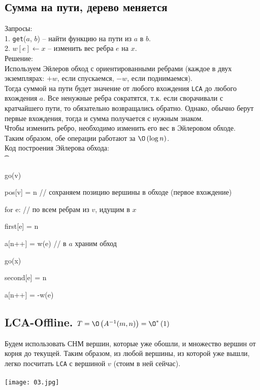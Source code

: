   \subsection{Сумма на пути, дерево меняется}
	Запросы: \\
	1. \texttt{get}($a$, $b$) -- найти функцию на пути из $a$ в $b$.\\
	2. $w[e] \leftarrow x$ -- изменить вес ребра $e$ на $x$. \\
	Решение: \\
	Используем Эйлеров обход с ориентированными ребрами (каждое в двух экземплярах: $+w$, если спускаемся, $-w$, если поднимаемся). \\
	Тогда суммой на пути будет значение от любого вхождения \texttt{LCA} до любого вхождения $a$. Все ненужные ребра сократятся, т.к. если сворачивали с кратчайшего пути, то обязательно возвращались обратно. Однако, обычно берут первые вхождения, тогда и сумма получается с нужным знаком.\\
	Чтобы изменить ребро, необходимо изменить его вес в Эйлеровом обходе. \\
	Таким образом, обе операции работают за $\O\left(\log{n}\right)$. \\
	Код построения Эйлерова обхода: \\
        \t{\begin{MyList}
          \item \hspace{0em} go(v)
          \item \hspace{2em}   pos[v] = n // сохраняем позицию вершины в обходе (первое вхождение)
          \item \hspace{2em}   for e: // по всем ребрам из $v$, идущим в $x$
          \item \hspace{4em}   first[e] = n
          \item \hspace{4em}   a[n++] = w(e) // в $a$ храним обход
          \item \hspace{4em}   go(x)
          \item \hspace{4em}   second[e] = n 
          \item \hspace{4em}   a[n++] = -w(e)
        \end{MyList}}

  \subsection{LCA-Offline. $T = \O\left(A^{-1}(m, n)\right) = \O^*\left(1\right)$}
       Будем использовать СНМ вершин, которые уже обошли, и множество вершин от корня до текущей. Таким образом, из любой вершины, из которой уже вышли, легко посчитать \texttt{LCA} с вершиной $v$ (стоим в ней сейчас).
\\ \\
\texttt{[image: 03.jpg]}\\


